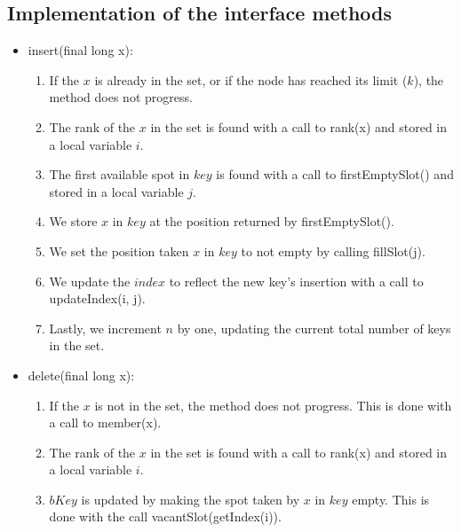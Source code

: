 \subsection{Implementation of the interface methods} \label{sec:binaryRankInterfaceImplementation}
\begin{itemize}
    \item
    {\ttfamily insert(final long x)}:
    \begin{enumerate}
        \item
        If the $x$ is already in the set, or if the node has reached its limit ($k$), the method does not progress.
        
        \item
        The rank of the $x$ in the set is found with a call to {\ttfamily rank(x)} and stored in a local variable $i$.
        
        \item
        The first available spot in $key$ is found with a call to {\ttfamily firstEmptySlot()} and stored in a local variable $j$.
        
        \item
        We store $x$ in $key$ at the position returned by {\ttfamily firstEmptySlot()}.
        
        \item
        We set the position taken $x$ in $key$ to not empty by calling {\ttfamily fillSlot(j)}.
        
        \item
        We update the $index$ to reflect the new key's insertion with a call to {\ttfamily updateIndex(i, j)}.
        
        \item
        Lastly, we increment $n$ by one, updating the current total number of keys in the set.
    \end{enumerate}
    
    \item
    {\ttfamily delete(final long x)}:
    \begin{enumerate}
        \item
        If the $x$ is not in the set, the method does not progress. This is done with a call to {\ttfamily member(x)}.
        
        \item
        The rank of the $x$ in the set is found with a call to {\ttfamily rank(x)} and stored in a local variable $i$.
        
        \item
        $bKey$ is updated by making the spot taken by $x$ in $key$ empty. This is done with the call {\ttfamily vacantSlot(getIndex(i))}.
        

\end{enumerate}
\end{itemize}
